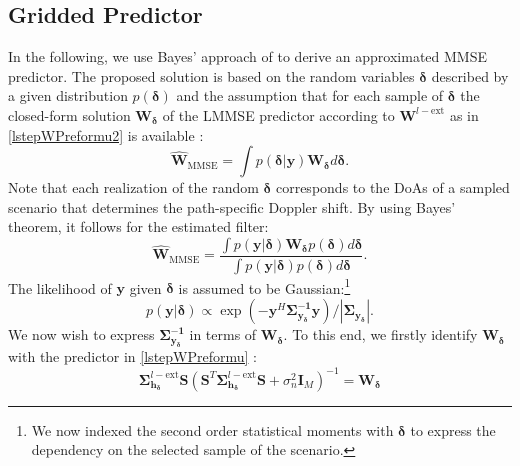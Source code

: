 \documentclass[12pt, draftclsnofoot, onecolumn]{IEEEtran}
\begin{document}
\subsection{Gridded Predictor}
\label{sec:typestyle}
In the following, we use Bayes' approach of \cite{Neumann} to derive an approximated MMSE predictor. The proposed solution is based on the random variables ${\boldsymbol{\delta}}$ described by a given distribution $p({\boldsymbol{\delta}})$ and the assumption that for each sample of ${\boldsymbol{\delta}}$ the closed-form solution $ {\mathbf{W}}_{\boldsymbol{\delta}} $ of the LMMSE predictor according to $ \mathbf{W}^{l-\text{ext}} $ as in \eqref{lstepWPreformu2} is available \cite{Neumann, Koller, Hellings}:
\begin{equation}
       \hat{\mathbf{W}}_\text{MMSE} = \int p({\boldsymbol{\delta}}|\mathbf{y}) {\mathbf{W}}_{\boldsymbol{\delta}} d{\boldsymbol{\delta}}.
\end{equation}
Note that each realization of the random ${\boldsymbol{\delta}}$ corresponds to the DoAs of a sampled scenario that determines the path-specific Doppler shift.
By using Bayes' theorem, it follows for the estimated filter:
\begin{equation}
       \hat{\mathbf{W}}_\text{MMSE} = \dfrac{\int p(\mathbf{y}|{\boldsymbol{\delta}}) {\mathbf{W}}_{\boldsymbol{\delta}} p({\boldsymbol{\delta}})  d{\boldsymbol{\delta}} } { \int p(\mathbf{y}|{\boldsymbol{\delta}}) p( {\boldsymbol{\delta}}) d{\boldsymbol{\delta}} }.
       \label{estFilt}
\end{equation}
The likelihood of $\mathbf{y}$ given ${\boldsymbol{\delta}}$ is assumed to be Gaussian:\footnote{We now indexed the second order statistical moments with $\boldsymbol{\delta}$ to express the dependency on the selected sample of the scenario.}
\begin{equation}
  p(\mathbf{y}|{\boldsymbol{\delta}}) \propto {\exp{(-\mathbf{y}^H\mathbf{\Sigma_{y_{\boldsymbol{\delta}}}^{-1}}\mathbf{y})}}/{|\mathbf{\Sigma_{y_{\boldsymbol{\delta}}}}|}.
\end{equation}
We now wish to express $\mathbf{\Sigma_{y_{\boldsymbol{\delta}}}^{-1}}$ in terms of ${\mathbf{W}}_{\boldsymbol{\delta}}$. To this end, we firstly identify ${\mathbf{W}}_{\boldsymbol{\delta}}$ with the predictor in \eqref{lstepWPreformu} \cite{turan2019learning}:
\begin{equation}
       \mathbf{\Sigma}_\mathbf{h_{\boldsymbol{\delta}}}^{l-\text{ext}} \mathbf{S} (\mathbf{S}^T \mathbf{\Sigma}_\mathbf{h_{\boldsymbol{\delta}}}^{l-\text{ext}} \mathbf{S} + \sigma_n^2\mathbf{I}_M)^{-1} = {\mathbf{W}}_{\boldsymbol{\delta}} 
\end{equation}
\end{document}
